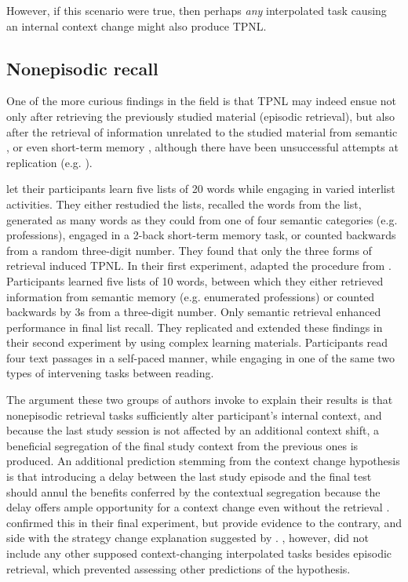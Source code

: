 \documentclass[../main.tex]{subfiles}
\begin{document}
However, if this scenario were true, then perhaps \textit{any} interpolated 
task causing an internal context change might also produce TPNL.

\hypertarget{nonepisodic}{%
	\subsection{Nonepisodic recall}}

One of the more curious findings in the field is that TPNL may indeed 
ensue not only after retrieving the previously studied material (episodic 
retrieval), but also after the retrieval of information unrelated to the 
studied material from semantic \citep{divisRetrievalSpeedsContext2014, 
	pastotterRetrievalLearningFacilitates2011}, or even short-term memory 
	\citep{pastotterRetrievalLearningFacilitates2011}, although there have 
	been unsuccessful attempts at replication (e.g. 
\citealp{weinsteinNotAllRetrieval2015}). 

\cite{pastotterRetrievalLearningFacilitates2011} let their participants 
learn five lists of 20 words while engaging in varied interlist activities. 
They either restudied the lists, recalled the words from the list, generated 
as many words as they could from one of four semantic categories (e.g. 
professions), engaged in a 2-back short-term memory task, or counted 
backwards from a random three-digit number. They found that only the three 
forms of retrieval induced TPNL. In their first experiment, 
\cite{divisRetrievalSpeedsContext2014} adapted the procedure from 
\cite{pastotterRetrievalLearningFacilitates2011}. Participants learned five 
lists of 10 words, between which they either retrieved information from 
semantic memory (e.g. enumerated professions) or counted backwards by 3s 
from a three-digit number. Only semantic retrieval enhanced performance in 
final list recall. They replicated and extended these findings in their 
second experiment by using complex learning materials. Participants read 
four text passages in a self-paced manner, while engaging in one of the same 
two types of intervening tasks between reading. 

The argument these two groups of authors invoke to explain their results is 
that nonepisodic retrieval tasks sufficiently alter participant's internal 
context, and because the last study session is not affected by an additional 
context shift, a beneficial segregation of the final study context from the 
previous ones is produced. An additional prediction stemming from the 
context change hypothesis is that introducing a delay between the last study 
episode and the final test should annul the benefits conferred by the 
contextual segregation because the delay offers ample opportunity for a 
context change even without the retrieval 
\citep{chanRetrievalPotentiatesNew2018}. 
\cite{divisRetrievalSpeedsContext2014} confirmed this in their final 
experiment, but \cite{chanTestingPotentiatesNew2018} provide evidence to the 
contrary, and side with the strategy change explanation suggested by 
\cite{wissmanInterimTestEffect2011}. \cite{chanTestingPotentiatesNew2018}, 
however, did not include any other supposed context-changing interpolated 
tasks besides episodic retrieval, which prevented assessing other 
predictions of the hypothesis. 
\end{document}
